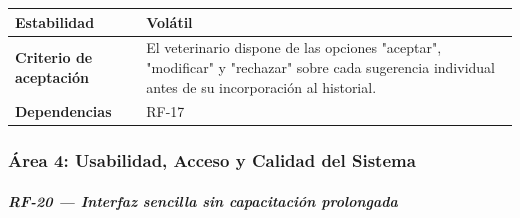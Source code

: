 {\def\LTcaptype{none} %
\begin{longtable}[]{@{}
  >{\raggedright\arraybackslash}p{}
  >{\raggedright\arraybackslash}p{}@{}}
\toprule\noalign{}
\begin{minipage}[b]{\linewidth}\raggedright
\textbf{Estabilidad}
\end{minipage} & \begin{minipage}[b]{\linewidth}\raggedright
Volátil
\end{minipage} \\
\midrule\noalign{}
\endhead
\bottomrule\noalign{}
\endlastfoot
\textbf{Criterio de aceptación} &
\begin{minipage}[t]{\linewidth}\raggedright
El veterinario dispone de las opciones "aceptar", "modificar" y
"rechazar" sobre cada sugerencia individual antes de su incorporación al
historial.
\end{minipage} \\
\textbf{Dependencias} & \begin{minipage}[t]{\linewidth}\raggedright
RF-17
\end{minipage} \\
\end{longtable}
}

\subsubsection{Área 4: Usabilidad, Acceso y Calidad del
Sistema}\label{uxe1rea-4-usabilidad-acceso-y-calidad-del-sistema}

\subparagraph{RF-20 --- Interfaz sencilla sin capacitación
prolongada}\label{rf-20-interfaz-sencilla-sin-capacitaciuxf3n-prolongada}

